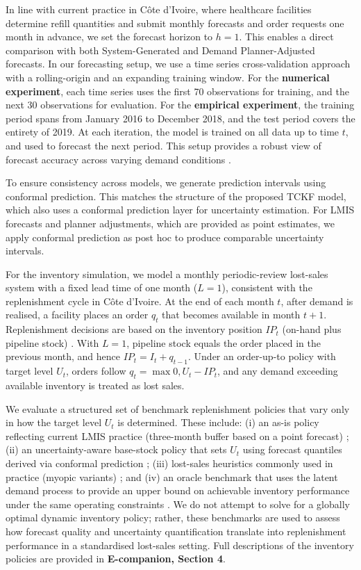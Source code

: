 \documentclass[
  11pt,
  authoryear,
  doubleblind,
  3p]{elsarticle}
\begin{document}
In line with current practice in Côte d'Ivoire, where healthcare
facilities determine refill quantities and submit monthly forecasts and
order requests one month in advance, we set the forecast horizon to
\(h = 1\). This enables a direct comparison with both System-Generated
and Demand Planner-Adjusted forecasts. In our forecasting setup, we use
a time series cross-validation approach with a rolling-origin and an
expanding training window. For the \textbf{numerical experiment}, each
time series uses the first 70 observations for training, and the next 30
observations for evaluation. For the \textbf{empirical experiment}, the
training period spans from January 2016 to December 2018, and the test
period covers the entirety of 2019. At each iteration, the model is
trained on all data up to time \(t\), and used to forecast the next
period. This setup provides a robust view of forecast accuracy across
varying demand conditions \citep{svetunkov2023}.

To ensure consistency across models, we generate prediction intervals
using conformal prediction. This matches the structure of the proposed
TCKF model, which also uses a conformal prediction layer for uncertainty
estimation. For LMIS forecasts and planner adjustments, which are
provided as point estimates, we apply conformal prediction as post hoc
to produce comparable uncertainty intervals.

For the inventory simulation, we model a monthly periodic-review
lost-sales system with a fixed lead time of one month (\(L=1\)),
consistent with the replenishment cycle in Côte d'Ivoire. At the end of
each month \(t\), after demand is realised, a facility places an order
\(q_t\) that becomes available in month \(t+1\). Replenishment decisions
are based on the inventory position \(IP_t\) (on-hand plus pipeline
stock) \citep{bijvank2011}. With \(L=1\), pipeline stock equals the
order placed in the previous month, and hence \(IP_t = I_t + q_{t-1}\).
Under an order-up-to policy with target level \(U_t\), orders follow
\(q_t=\max{0, U_t - IP_t}\), and any demand exceeding available
inventory is treated as lost sales.

We evaluate a structured set of benchmark replenishment policies that
vary only in how the target level \(U_t\) is determined. These include:
(i) an as-is policy reflecting current LMIS practice (three-month buffer
based on a point forecast) \citep{hewage2025}; (ii) an uncertainty-aware
base-stock policy that sets \(U_t\) using forecast quantiles derived via
conformal prediction \citep{babai2025}; (iii) lost-sales heuristics
commonly used in practice (myopic variants) \citep{bijvank2011}; and
(iv) an oracle benchmark that uses the latent demand process to provide
an upper bound on achievable inventory performance under the same
operating constraints \citep{sachs2014}. We do not attempt to solve for
a globally optimal dynamic inventory policy; rather, these benchmarks
are used to assess how forecast quality and uncertainty quantification
translate into replenishment performance in a standardised lost-sales
setting. Full descriptions of the inventory policies are provided in
\textbf{E-companion, Section 4}.
\end{document}
